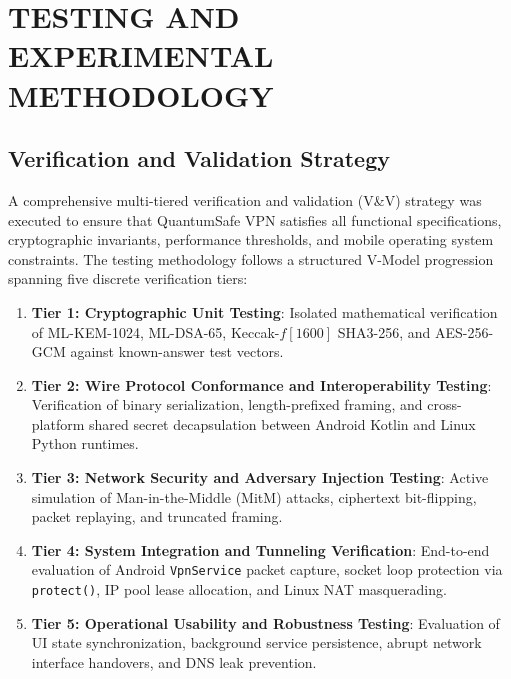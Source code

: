 
\chapter{TESTING AND EXPERIMENTAL METHODOLOGY}
\label{chap:testing}

\section{Verification and Validation Strategy}
\label{sec:testing_strategy}

A comprehensive multi-tiered verification and validation (V\&V) strategy was executed to ensure that QuantumSafe VPN satisfies all functional specifications, cryptographic invariants, performance thresholds, and mobile operating system constraints. The testing methodology follows a structured V-Model progression spanning five discrete verification tiers:

\begin{enumerate}
    \item \textbf{Tier 1: Cryptographic Unit Testing}: Isolated mathematical verification of ML-KEM-1024, ML-DSA-65, Keccak-$f[1600]$ SHA3-256, and AES-256-GCM against known-answer test vectors.
    \item \textbf{Tier 2: Wire Protocol Conformance and Interoperability Testing}: Verification of binary serialization, length-prefixed framing, and cross-platform shared secret decapsulation between Android Kotlin and Linux Python runtimes.
    \item \textbf{Tier 3: Network Security and Adversary Injection Testing}: Active simulation of Man-in-the-Middle (MitM) attacks, ciphertext bit-flipping, packet replaying, and truncated framing.
    \item \textbf{Tier 4: System Integration and Tunneling Verification}: End-to-end evaluation of Android \texttt{VpnService} packet capture, socket loop protection via \texttt{protect()}, IP pool lease allocation, and Linux NAT masquerading.
    \item \textbf{Tier 5: Operational Usability and Robustness Testing}: Evaluation of UI state synchronization, background service persistence, abrupt network interface handovers, and DNS leak prevention.
\end{enumerate}


